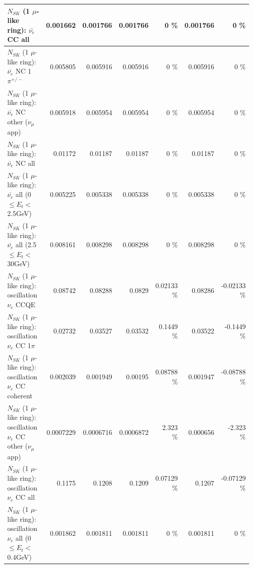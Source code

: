\begin{table}
\begin{tabular}{| l | r | r | r  r | r  r |}
                            $N_{SK}$ (1 $\mu$-like ring): $\bar{\nu_{e}}$ CC all &        0.001662 &        0.001766 &        0.001766 &        0 \%  &        0.001766 &        0 \%  \\ 
\hline
                     $N_{SK}$ (1 $\mu$-like ring): $\bar{\nu_e}$ NC 1$\pi^{+/-}$ &        0.005805 &        0.005916 &        0.005916 &        0 \%  &        0.005916 &        0 \%  \\ 
            $N_{SK}$ (1 $\mu$-like ring): $\bar{\nu_e}$ NC other ($\nu_\mu$ app) &        0.005918 &        0.005954 &        0.005954 &        0 \%  &        0.005954 &        0 \%  \\ 
                            $N_{SK}$ (1 $\mu$-like ring): $\bar{\nu_{e}}$ NC all &         0.01172 &         0.01187 &         0.01187 &        0 \%  &         0.01187 &        0 \%  \\ 
\hline
     $N_{SK}$ (1 $\mu$-like ring): $\bar{\nu_{e}}$ all (0 $\leq E_{t} <$ 2.5GeV) &        0.005225 &        0.005338 &        0.005338 &        0 \%  &        0.005338 &        0 \%  \\ 
    $N_{SK}$ (1 $\mu$-like ring): $\bar{\nu_{e}}$ all (2.5 $\leq E_{t} <$ 30GeV) &        0.008161 &        0.008298 &        0.008298 &        0 \%  &        0.008298 &        0 \%  \\ 
\hline
\hline
\hline
                          $N_{SK}$ (1 $\mu$-like ring): oscillation $\nu_e$ CCQE &         0.08742 &         0.08288 &          0.0829 &  0.02133 \%  &         0.08286 & -0.02133 \%  \\ 
                     $N_{SK}$ (1 $\mu$-like ring): oscillation $\nu_e$ CC 1$\pi$ &         0.02732 &         0.03527 &         0.03532 &   0.1449 \%  &         0.03522 &  -0.1449 \%  \\ 
                   $N_{SK}$ (1 $\mu$-like ring): oscillation $\nu_e$ CC coherent &        0.002039 &        0.001949 &         0.00195 &  0.08788 \%  &        0.001947 & -0.08788 \%  \\ 
      $N_{SK}$ (1 $\mu$-like ring): oscillation $\nu_e$ CC other ($\nu_\mu$ app) &       0.0007229 &       0.0006716 &       0.0006872 &    2.323 \%  &        0.000656 &   -2.323 \%  \\ 
                       $N_{SK}$ (1 $\mu$-like ring): oscillation $\nu_e$  CC all &          0.1175 &          0.1208 &          0.1209 &  0.07129 \%  &          0.1207 & -0.07129 \%  \\ 
\hline
$N_{SK}$ (1 $\mu$-like ring): oscillation $\nu_{e}$ all (0 $\leq E_{t} <$ 0.4GeV) &        0.001862 &        0.001811 &        0.001811 &        0 \%  &        0.001811 &        0 \%  \\ 

\end{tabular}
\end{table}
